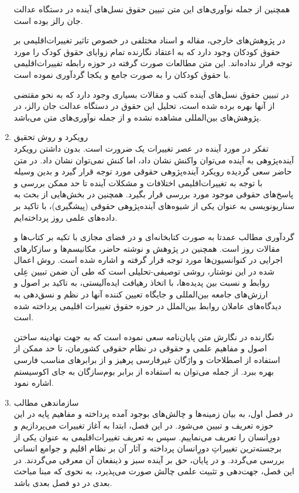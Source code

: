 \begin{enumerate}
		همچنین از جمله نوآوری‌های این متن تبیین حقوق نسل‌های آینده در دستگاه عدالت جان رالز بوده است. 
		
		
	
در پژوهش‌های خارجی، مقاله و اسناد مختلفی در خصوص تاثیر تغییرات‌اقلیمی بر حقوق کودکان وجود دارد که به اعتقاد نگارنده تمام زوایای حقوق کودک را مورد توجه قرار نداده‌اند. این متن مطالعات صورت گرفته در حوزه رابطه تفییرات‌اقلیمی با حقوق کودکان را به صورت جامع و یکجا گردآوری نموده است. 

در تبیین حقوق نسل‌های آینده کتب و مقالات بسیاری وجود دارد که به نحو مقتضی از آنها بهره برده شده است، تحلیل این حقوق در دستگاه عدالت جان رالز، در پژوهش‌های بین‌المللی مشاهده نشده و از جمله نوآوری‌های متن می‌باشد. 
		
		


	
	\item رویکرد و روش تحقیق\\
تفکر در مورد آینده در عصر تغییرات یک ضرورت است. بدون داشتن رویکرد آینده‌پژوهی به آینده می‌توان واکنش نشان داد، اما کنش نمی‌توان نشان داد. در متن حاضر سعی گردیده رویکرد آینده‌پژوهی حقوقی مورد توجه قرار گیرد و بدین وسیله با توجه به تغییرات‌اقلیمی اختلافات و مشکلات آینده تا حد ممکن بررسی و پاسخ‌های حقوقی موجود مورد بررسی قرار بگیرد. همچنین در بخش‌هایی از بحث به سناریونویسی به عنوان یکی از شیوه‌های آینده‌پژوهی حقوقی (پیشگیری)، با تاکید بر داده‌های علمی روز پرداخته‌ایم.
	
گردآوری مطالب عمدتا به صورت کتابخانه‌ای و در فضای مجازی با تکیه بر کتاب‌ها و مقالات روز است. همچنین در پژوهش و نوشته حاضر،  مکانیسم‌ها و سازکار‌های اجرایی   در کنوانسیون‌ها  مورد توجه قرار گرفته و اشاره شده است. روش اعمال شده در این نوشتار، روشی توصیفی-تحلیلی است که طی آن ضمن تبیین عِلی روابط و نسبت بین پدیده‌ها، با اتخاذ رهیافت ایده‌آلیستی، به تاکید بر اصول و ارزش‌های جامعه بین‌المللی و جایگاه تعیین کننده آنها در نظم و نسق‌دهی به دیدگاه‌های عاملان روابط بین‌الملل در حوزه حقوق تغییرات اقلیمی پرداخته‌ شده است. 

	 
	
	نگارنده در نگارش متن پایان‌نامه سعی نموده است که به جهت نهادینه ساختن اصول و مفاهیم علمی و حقوقی در نظام حقوقی کشورمان، تا حد ممکن از استفاده از اصطلاحات و واژگان غیر‌فارسی پرهیز و از برابر‌های مناسب فارسی بهره ببرد. از جمله می‌توان به استفاده از برابر بوم‌سازگان به جای اکوسیستم اشاره نمود. 
	
		
	\item سازماندهی مطالب\\
	در فصل اول، به بیان زمینه‌ها و چالش‌های بوجود آمده پرداخته و مفاهیم پایه در این حوزه تعریف و تبیین می‌شود. در این فصل، ابتدا به آغاز تغییرات می‌پردازیم و دورِانسان را تعریف می‌نماییم. سپس به تعریف تغییرات‌اقلیمی به عنوان یکی از برجسته‌ترین تغییراتِ دورِانسان پرداخته و آثار آن بر نظام اقلیم و جوامع انسانی بررسی می‌گردد. و در پایان، حق بر آینده سبز و ذینفعان آن معرفی می‌گردند. در این فصل، جهت‌دهی و تثبیت علمی چالش صورت می‌پذیرد، به نحوی که مبنا مباحث بعدی در دو فصل بعدی باشد. 
	

\end{enumerate}
